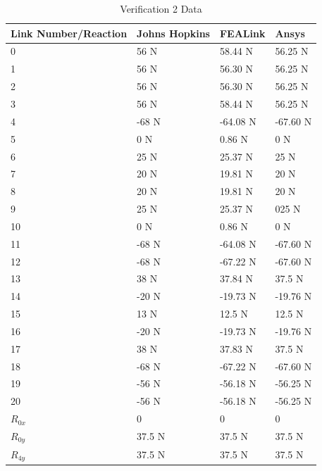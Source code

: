 \documentclass[11pt, oneside]{article}   	%
\begin{document}
\begin{table}[]
\centering
\caption{Verification 2 Data}
\label{table:V2}
\begin{tabular}{l|l|l|l}
Link Number/Reaction & Johns Hopkins & FEALink    & Ansys \\ \hline
0           & 56 N             & 58.44 N  & 56.25 N  \\
1           & 56 N             & 56.30 N  & 56.25 N  \\
2           & 56 N             & 56.30 N  & 56.25 N  \\
3           & 56 N             & 58.44 N  & 56.25 N  \\
4           & -68 N            & -64.08 N & -67.60 N \\
5           & 0 N              & 0.86 N   & 0 N      \\
6           & 25 N             & 25.37 N  & 25 N     \\
7           & 20 N             & 19.81 N  & 20 N     \\
8           & 20 N             & 19.81 N  & 20 N     \\
9           & 25 N             & 25.37 N  & 025 N    \\
10          & 0 N              & 0.86 N   & 0 N      \\
11          & -68 N            & -64.08 N & -67.60 N \\
12          & -68 N            & -67.22 N & -67.60 N \\
13          & 38 N             & 37.84 N  & 37.5 N   \\
14          & -20 N            & -19.73 N & -19.76 N \\
15          & 13 N             & 12.5 N   & 12.5 N   \\
16          & -20 N            & -19.73 N & -19.76 N \\
17          & 38 N             & 37.83 N  & 37.5 N   \\
18          & -68 N            & -67.22 N & -67.60 N \\
19          & -56 N            & -56.18 N & -56.25 N \\
20          & -56 N            & -56.18 N & -56.25 N \\
$R_{0x}$& 0                & 0        & 0        \\
$R_{0y}$& 37.5 N           & 37.5 N   & 37.5 N   \\
$R_{4y}$& 37.5 N           & 37.5 N   & 37.5 N  
\end{tabular}
\end{table}
\end{document}

